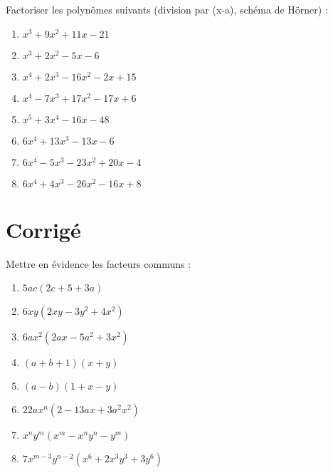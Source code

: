 \begin{exercice}
Factoriser les polynômes suivants (division par (x-a), schéma de Hörner) :
\begin{multicols}{2}
\begin{enumerate}
\item ${{x}^{3}}+9{{x}^{2}}+11x-21$
\item ${{x}^{3}}+2{{x}^{2}}-5x-6$
\item ${{x}^{4}}+2{{x}^{3}}-16{{x}^{2}}-2x+15$
\item ${{x}^{4}}-7{{x}^{3}}+17{{x}^{2}}-17x+6$
\item ${{x}^{5}}+3{{x}^{4}}-16x-48$
\item $6{{x}^{4}}+13{{x}^{3}}-13x-6$
\item $6{{x}^{4}}-5{{x}^{3}}-23{{x}^{2}}+20x-4$
\item $6{{x}^{4}}+4{{x}^{3}}-26{{x}^{2}}-16x+8$
\end{enumerate}
\end{multicols}
\end{exercice}

\section{Corrigé}

\begin{solution}
 Mettre en évidence les facteurs communs : 
\begin{enumerate}
\item $5ac(2c+5+3a)$
\item $6xy(2xy-3{{y}^{2}}+4{{x}^{2}})$
\item $6a{{x}^{2}}(2ax-5{{a}^{2}}+3{{x}^{2}})$
\item $(a+b+1)(x+y)$
\item $(a-b)(1+x-y)$
\item $22a{{x}^{n}}(2-13ax+3{{a}^{2}}{{x}^{2}})$
\item ${{x}^{n}}{{y}^{m}}({{x}^{m}}-{{x}^{n}}{{y}^{n}}-{{y}^{m}})$
\item $7{{x}^{m-3}}{{y}^{n-2}}({{x}^{6}}+2{{x}^{3}}{{y}^{3}}+3{{y}^{6}})$ 
\end{enumerate}
\end{solution}

